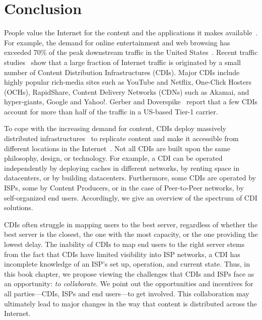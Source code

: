 \section{Conclusion}\label{sec:conclusion}

People value the Internet for the content and the applications it makes
available~\cite{CCN}. For example, the demand for online entertainment and web
browsing has exceeded 70\% of the peak downstream traffic in the United
States~\cite{sandvine}. Recent traffic
studies~\cite{TrafficTypesGrowth:2011,arbor,PADIS2010} show that a large
fraction of Internet traffic is originated by a small number of Content
Distribution Infrastructures (CDIs). Major CDIs include highly popular
rich-media sites such as YouTube and Netflix, One-Click Hosters (OCHs), \eg
RapidShare, Content Delivery Networks (CDNs) such as Akamai, and hyper-giants,
\eg Google and Yahoo!. Gerber and Doverspike~\cite{TrafficTypesGrowth:2011}
report that a few CDIs account for more than half of the traffic in a US-based
Tier-1 carrier.

To cope with the increasing demand for content, CDIs deploy massively
distributed infrastructures~\cite{ImprovingPerformanceInternet2009} to
replicate content and make it accessible from different locations in the
Internet~\cite{CDNsec2009,Cartography}.  Not all CDIs are built upon the same
philosophy, design, or technology. For example, a CDI can be operated
independently by deploying caches in different networks, by renting space in
datacenters, or by building datacenters. Furthermore, some CDIs are operated by
ISPs, some by Content Producers, or in the case of Peer-to-Peer networks, by
self-organized end users. Accordingly, we give an overview of the spectrum of
CDI solutions.

CDIs often struggle in mapping users to the best server, regardless of whether
the best server is the closest, the one with the most capacity, or the one
providing the lowest delay.  The inability of CDIs to map end users to the
right server stems from the fact that CDIs have limited visibility into ISP
networks, \ie a CDI has incomplete knowledge of an ISP's set up, operation, and
current state.  Thus, in this book chapter, we propose viewing the challenges
that CDIs and ISPs face as an opportunity: \emph{to collaborate}.  We point out
the opportunities and incentives for all parties---CDIs, ISPs and end
users---to get involved. This collaboration may ultimately lead to major
changes in the way that content is distributed across the Internet.

